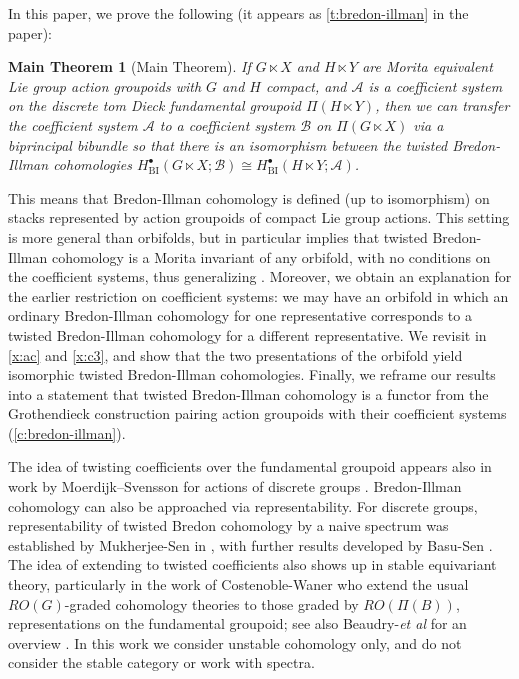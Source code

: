 \documentclass[12pt,reqno]{amsart}
\newcommand{\calA}{{\mathcal{A}}}
\newcommand{\calB}{{\mathcal{B}}}
\theoremstyle{plain}
\newtheorem*{maintheorem}{Main Theorem}
\theoremstyle{definition}
\newcommand{\BI}{{\operatorname{BI}}} %
\begin{document}
In this paper, we prove the following (it appears as \cref{t:bredon-illman} in the paper):
\begin{maintheorem}[Main Theorem]
    If $G\ltimes X$ and $H\ltimes Y$ are Morita equivalent Lie group action groupoids with $G$ and $H$ compact, and $\calA$ is a coefficient system on the discrete tom Dieck fundamental groupoid $\Pi(H\ltimes Y)$, then we can transfer the coefficient system $\calA$ to a coefficient system $\calB$ on $\Pi(G \ltimes X)$ via a biprincipal bibundle so that there is an isomorphism between the twisted Bredon-Illman cohomologies $H^\bullet_\BI(G\ltimes X;\calB)\cong H^\bullet_\BI(H\ltimes Y;\calA)$.
\end{maintheorem}
This means that Bredon-Illman cohomology is defined (up to isomorphism) on stacks represented by action groupoids of compact Lie group actions.  This setting is more general  than orbifolds, but in particular implies that  twisted Bredon-Illman cohomology is a  Morita invariant of any orbifold, with no conditions on the coefficient systems, thus generalizing \cite{PS:translation}.  Moreover, we obtain an explanation for the earlier restriction on coefficient systems:  we may have an orbifold in which an ordinary Bredon-Illman cohomology for one representative corresponds to a twisted Bredon-Illman cohomology for a different representative.   We revisit \cite[Example 5.3]{PS:translation} in \cref{x:ac} and \cref{x:c3}, and show that the two presentations of the orbifold yield isomorphic twisted Bredon-Illman cohomologies. Finally, we reframe our results into a statement that twisted Bredon-Illman cohomology is a functor from the Grothendieck construction pairing action groupoids with their coefficient systems  (\cref{c:bredon-illman}).      

  
The idea of twisting coefficients over the fundamental groupoid appears also in work by  Moerdijk–Svensson for actions of discrete groups \cites{moerdijk-svensson}.    Bredon-Illman cohomology can also be approached via representability. For discrete groups, representability of twisted Bredon cohomology by a naive spectrum was established
by Mukherjee-Sen in \cite{MuSen}, with further results developed by  Basu-Sen \cite{BaSen}.  The idea of extending to twisted coefficients also shows up in stable equivariant theory, particularly in the work of Costenoble-Waner \cite{CW} who extend the usual $RO(G)$-graded cohomology theories to those graded  by $RO(\Pi(B))$, representations on the fundamental groupoid;   see also Beaudry-\emph{et al} for an overview \cite{Beaudry}.  In this  work we consider unstable cohomology only, and do not consider the stable category or work with spectra.  
\end{document}
